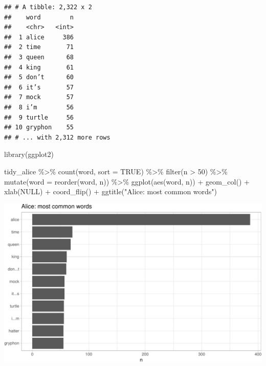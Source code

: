 \documentclass[
]{article}
\newenvironment{Shaded}{\begin{snugshade}}{\end{snugshade}}
\newcommand{\AttributeTok}[1]{\textcolor[rgb]{0.77,0.63,0.00}{#1}}
\newcommand{\ConstantTok}[1]{\textcolor[rgb]{0.00,0.00,0.00}{#1}}
\newcommand{\DecValTok}[1]{\textcolor[rgb]{0.00,0.00,0.81}{#1}}
\newcommand{\FunctionTok}[1]{\textcolor[rgb]{0.00,0.00,0.00}{#1}}
\newcommand{\NormalTok}[1]{#1}
\newcommand{\SpecialCharTok}[1]{\textcolor[rgb]{0.00,0.00,0.00}{#1}}
\newcommand{\StringTok}[1]{\textcolor[rgb]{0.31,0.60,0.02}{#1}}
\begin{document}
\begin{verbatim}
## # A tibble: 2,322 x 2
##    word        n
##    <chr>   <int>
##  1 alice     386
##  2 time       71
##  3 queen      68
##  4 king       61
##  5 don’t      60
##  6 it’s       57
##  7 mock       57
##  8 i’m        56
##  9 turtle     56
## 10 gryphon    55
## # ... with 2,312 more rows
\end{verbatim}

\begin{Shaded}
\begin{Highlighting}[]
\FunctionTok{library}\NormalTok{(ggplot2)}


\NormalTok{tidy\_alice }\SpecialCharTok{\%\textgreater{}\%}
  \FunctionTok{count}\NormalTok{(word, }\AttributeTok{sort =} \ConstantTok{TRUE}\NormalTok{) }\SpecialCharTok{\%\textgreater{}\%}
  \FunctionTok{filter}\NormalTok{(n }\SpecialCharTok{\textgreater{}} \DecValTok{50}\NormalTok{) }\SpecialCharTok{\%\textgreater{}\%}
  \FunctionTok{mutate}\NormalTok{(}\AttributeTok{word =} \FunctionTok{reorder}\NormalTok{(word, n)) }\SpecialCharTok{\%\textgreater{}\%}
  \FunctionTok{ggplot}\NormalTok{(}\FunctionTok{aes}\NormalTok{(word, n)) }\SpecialCharTok{+}
  \FunctionTok{geom\_col}\NormalTok{() }\SpecialCharTok{+}
  \FunctionTok{xlab}\NormalTok{(}\ConstantTok{NULL}\NormalTok{) }\SpecialCharTok{+}
  \FunctionTok{coord\_flip}\NormalTok{() }\SpecialCharTok{+}
  \FunctionTok{ggtitle}\NormalTok{(}\StringTok{"Alice: most common words"}\NormalTok{)}
\end{Highlighting}
\end{Shaded}

\includegraphics{homework_1_files/figure-latex/unnamed-chunk-2-1.pdf}
\end{document}
